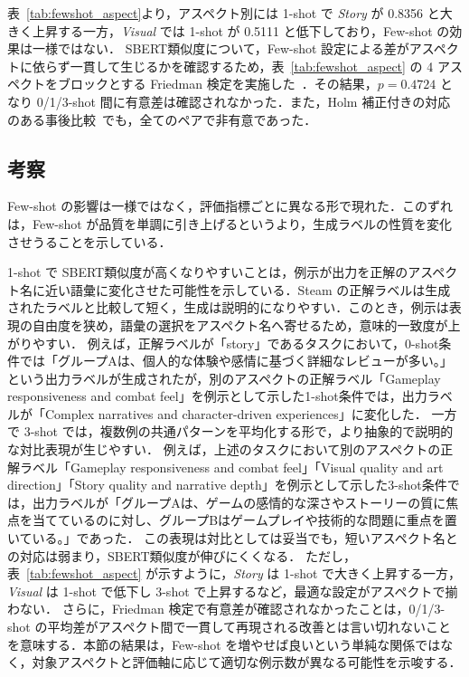 表~\ref{tab:fewshot_aspect}より，アスペクト別には 1-shot で \textit{Story} が 0.8356 と大きく上昇する一方，\textit{Visual} では 1-shot が 0.5111 と低下しており，Few-shot の効果は一様ではない．
SBERT類似度について，Few-shot 設定による差がアスペクトに依らず一貫して生じるかを確認するため，表~\ref{tab:fewshot_aspect} の 4 アスペクトをブロックとする Friedman 検定を実施した~\cite{friedman1937use}．その結果，$p=0.4724$ となり 0/1/3-shot 間に有意差は確認されなかった．また，Holm 補正付きの対応のある事後比較~\cite{holm1979simple}でも，全てのペアで非有意であった．

\subsection{考察}
Few-shot の影響は一様ではなく，評価指標ごとに異なる形で現れた．このずれは，Few-shot が品質を単調に引き上げるというより，生成ラベルの性質を変化させうることを示している．

1-shot で SBERT類似度が高くなりやすいことは，例示が出力を正解のアスペクト名に近い語彙に変化させた可能性を示している．Steam の正解ラベルは生成されたラベルと比較して短く，生成は説明的になりやすい．このとき，例示は表現の自由度を狭め，語彙の選択をアスペクト名へ寄せるため，意味的一致度が上がりやすい．
例えば，正解ラベルが「story」であるタスクにおいて，0-shot条件では「グループAは、個人的な体験や感情に基づく詳細なレビューが多い。」という出力ラベルが生成されたが，別のアスペクトの正解ラベル「Gameplay responsiveness and combat feel」を例示として示した1-shot条件では，出力ラベルが「Complex narratives and character-driven experiences」に変化した．
一方で 3-shot では，複数例の共通パターンを平均化する形で，より抽象的で説明的な対比表現が生じやすい．
例えば，上述のタスクにおいて別のアスペクトの正解ラベル「Gameplay responsiveness and combat feel」「Visual quality and art direction」「Story quality and narrative depth」を例示として示した3-shot条件では，出力ラベルが「グループAは、ゲームの感情的な深さやストーリーの質に焦点を当てているのに対し、グループBはゲームプレイや技術的な問題に重点を置いている。」であった．
この表現は対比としては妥当でも，短いアスペクト名との対応は弱まり，SBERT類似度が伸びにくくなる．
ただし，表~\ref{tab:fewshot_aspect} が示すように，\textit{Story} は 1-shot で大きく上昇する一方，\textit{Visual} は 1-shot で低下し 3-shot で上昇するなど，最適な設定がアスペクトで揃わない．
さらに，Friedman 検定で有意差が確認されなかったことは，0/1/3-shot の平均差がアスペクト間で一貫して再現される改善とは言い切れないことを意味する．本節の結果は，Few-shot を増やせば良いという単純な関係ではなく，対象アスペクトと評価軸に応じて適切な例示数が異なる可能性を示唆する．

